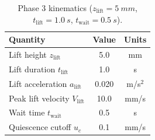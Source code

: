 \documentclass[11pt,a4paper]{article}
\begin{document}
\begin{table}[H]
\centering
\caption{Phase 3 kinematics ($z_\mathrm{lift} = \SI{5}{mm}$,
$t_\mathrm{lift} = \SI{1.0}{s}$, $t_\mathrm{wait} = \SI{0.5}{s}$).}
\label{tab:lift_kinematics}
\begin{tabular}{lcc}
\toprule
Quantity & Value & Units \\
\midrule
Lift height $z_\mathrm{lift}$ & 5.0 & mm \\
Lift duration $t_\mathrm{lift}$ & 1.0 & s \\
Lift acceleration $a_\mathrm{lift}$ & 0.020 & m/s$^2$ \\
Peak lift velocity $V_\mathrm{lift}$ & 10.0 & mm/s \\
Wait time $t_\mathrm{wait}$ & 0.5 & s \\
Quiescence cutoff $u_c$ & 0.1 & mm/s \\
\bottomrule
\end{tabular}
\end{table}
\end{document}
